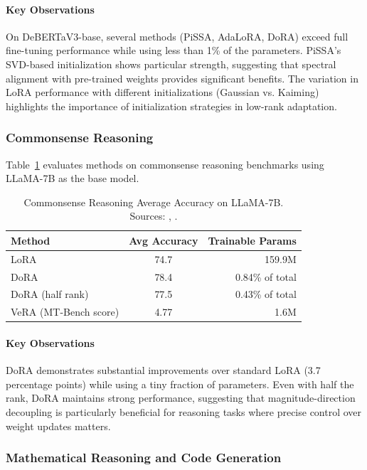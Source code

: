 \paragraph{Key Observations}
On DeBERTaV3-base, several methods (PiSSA, AdaLoRA, DoRA) exceed full fine-tuning performance while using less than 1\% of the parameters. PiSSA's SVD-based initialization shows particular strength, suggesting that spectral alignment with pre-trained weights provides significant benefits. The variation in LoRA performance with different initializations (Gaussian vs. Kaiming) highlights the importance of initialization strategies in low-rank adaptation.

\subsubsection{Commonsense Reasoning}

Table~\ref{tab:commonsense-llama} evaluates methods on commonsense reasoning benchmarks using LLaMA-7B as the base model.

\begin{table}[H]
  \centering
  \caption{Commonsense Reasoning Average Accuracy on LLaMA-7B. Sources: \cite{liu2024dora}, \cite{kopiczko2023vera}.}
  \label{tab:commonsense-llama}
  \begin{tabular}{lcr}
    \toprule
    Method & Avg Accuracy & Trainable Params \\
    \midrule
    LoRA & 74.7 & 159.9M \\
    DoRA & 78.4 & 0.84\% of total \\
    DoRA (half rank) & 77.5 & 0.43\% of total \\
    VeRA (MT-Bench score) & 4.77 & 1.6M \\
    \bottomrule
  \end{tabular}
\end{table}

\paragraph{Key Observations}
DoRA demonstrates substantial improvements over standard LoRA (3.7 percentage points) while using a tiny fraction of parameters. Even with half the rank, DoRA maintains strong performance, suggesting that magnitude-direction decoupling is particularly beneficial for reasoning tasks where precise control over weight updates matters.

\subsubsection{Mathematical Reasoning and Code Generation}

